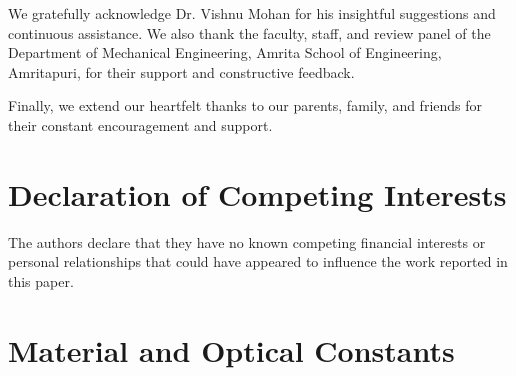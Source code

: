 \documentclass[review,12pt]{elsarticle}
\begin{document}
We gratefully acknowledge Dr. Vishnu Mohan for his insightful suggestions and continuous assistance. We also thank the faculty, staff, and review panel of the Department of Mechanical Engineering, Amrita School of Engineering, Amritapuri, for their support and constructive feedback.

Finally, we extend our heartfelt thanks to our parents, family, and friends for their constant encouragement and support.


\section*{Declaration of Competing Interests}

The authors declare that they have no known competing financial interests or
personal relationships that could have appeared to influence the work
reported in this paper.




\appendix

\section{Material and Optical Constants}
\label{app:constants}
\end{document}
